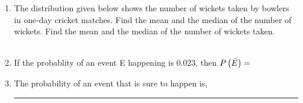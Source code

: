\documentclass[journal,12pt,twocolumn]{IEEEtran}
\begin{document}
\begin{enumerate}
     \vspace{2mm}\\
    \vspace{2mm}\\
    \item The distribution given below shows the number of wickets taken by bowlers in one-day cricket matches. Find the mean and the median of the number of wickets. Find the mean and the median of the number of wickets taken.\\
     \vspace{2mm}\\
	\item If the probablity of an event E happening is 0.023, then $P\left(\bar{E}\right) = $\\

\item The probability of an event that is sure to happen is, \rule{1.5cm}{0.15mm}\\

\end{enumerate}
\end{document}
